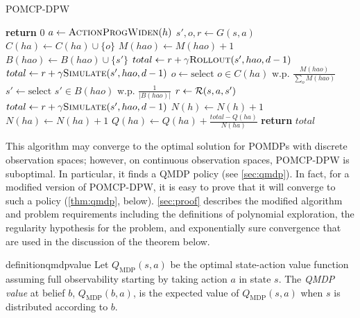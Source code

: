 \begin{algorithm}[htbp]
    \caption{POMCP-DPW} \label{alg:pomcpdpw}
    \begin{algorithmic}[1]
                \State \textbf{return} $0$
            \EndIf
            \State $a \gets \Call{ActionProgWiden}{h}$
                \State $s',o,r \gets G(s,a)$
                \State $C(ha) \gets C(ha) \cup \{o\}$
                \State $M(hao) \gets M(hao) + 1$
                \State $B(hao) \gets B(hao) \cup \{s'\}$ \label{lin:insertion}
                    \State $total \gets r + \gamma \Call{Rollout}{s', hao, d-1}$
                \Else
                    \State $total \gets r + \gamma \Call{Simulate}{s', hao, d-1}$
                \EndIf
            \Else \label{lin:notnew}
                \State $o \gets \text{select } o \in C(ha) \text{ w.p. } \frac{M(hao)}{\sum_{o} M(hao)}$ \label{lin:selecto}
                \State $s' \gets \text{select } s' \in B(hao) \text{ w.p. } \frac{1}{|B(hao)|}$ \label{lin:samples}
                \State $r \gets \mathcal{R}(s,a,s')$
                \State $total \gets r + \gamma \Call{Simulate}{s', hao, d-1}$
            \EndIf
            \State $N(h) \gets N(h)+1$
            \State $N(ha) \gets N(ha)+1$
            \State $Q(ha) \gets Q(ha) + \frac{total - Q(ha)}{N(ha)}$
            \State \textbf{return} $total$
        \EndProcedure
    \end{algorithmic}
\end{algorithm}

This algorithm may converge to the optimal solution for POMDPs with discrete observation spaces; however, on continuous observation spaces, POMCP-DPW is suboptimal.
In particular, it finds a QMDP policy (see \cref{sec:qmdp}).
In fact, for a modified version of POMCP-DPW, it is easy to prove that it will converge to such a policy (\cref{thm:qmdp}, below).
\cref{sec:proof} describes the modified algorithm and problem requirements including the definitions of polynomial exploration, the regularity hypothesis for the problem, and exponentially sure convergence that are used in the discussion of the theorem below.

\begin{restatable}{definition}{qmdpvalue}
    Let $Q_\text{MDP}(s,a)$ be the optimal state-action value function assuming full observability starting by taking action $a$ in state $s$. The \emph{QMDP value} at belief $b$, $Q_\text{MDP}(b,a)$, is the expected value of $Q_\text{MDP}(s,a)$ when $s$ is distributed according to $b$.
\end{restatable}

